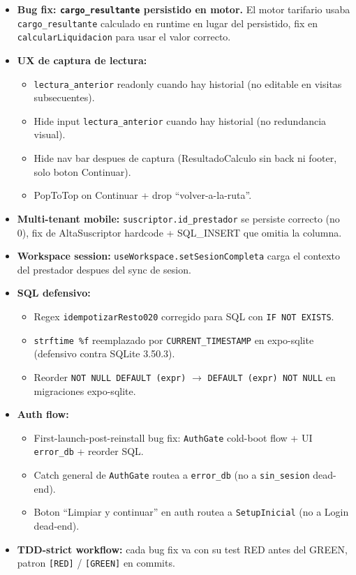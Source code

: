 \documentclass[11pt,a4paper,oneside]{report}
\begin{document}
\begin{itemize}[leftmargin=*]
    \item \textbf{Bug fix: \texttt{cargo\_resultante} persistido en motor.} El motor tarifario usaba \texttt{cargo\_resultante} calculado en runtime en lugar del persistido, fix en \texttt{calcularLiquidacion} para usar el valor correcto.
    \item \textbf{UX de captura de lectura:}
    \begin{itemize}
        \item \texttt{lectura\_anterior} readonly cuando hay historial (no editable en visitas subsecuentes).
        \item Hide input \texttt{lectura\_anterior} cuando hay historial (no redundancia visual).
        \item Hide nav bar despues de captura (ResultadoCalculo sin back ni footer, solo boton Continuar).
        \item PopToTop on Continuar + drop ``volver-a-la-ruta''.
    \end{itemize}
    \item \textbf{Multi-tenant mobile:} \texttt{suscriptor.id\_prestador} se persiste correcto (no 0), fix de AltaSuscriptor hardcode + SQL\_INSERT que omitia la columna.
    \item \textbf{Workspace session:} \texttt{useWorkspace.setSesionCompleta} carga el contexto del prestador despues del sync de sesion.
    \item \textbf{SQL defensivo:}
    \begin{itemize}
        \item Regex \texttt{idempotizarResto020} corregido para SQL con \texttt{IF NOT EXISTS}.
        \item \texttt{strftime \%f} reemplazado por \texttt{CURRENT\_TIMESTAMP} en expo-sqlite (defensivo contra SQLite 3.50.3).
        \item Reorder \texttt{NOT NULL DEFAULT (expr)} $\to$ \texttt{DEFAULT (expr) NOT NULL} en migraciones expo-sqlite.
    \end{itemize}
    \item \textbf{Auth flow:}
    \begin{itemize}
        \item First-launch-post-reinstall bug fix: \texttt{AuthGate} cold-boot flow + UI \texttt{error\_db} + reorder SQL.
        \item Catch general de \texttt{AuthGate} routea a \texttt{error\_db} (no a \texttt{sin\_sesion} dead-end).
        \item Boton ``Limpiar y continuar'' en auth routea a \texttt{SetupInicial} (no a Login dead-end).
    \end{itemize}
    \item \textbf{TDD-strict workflow:} cada bug fix va con su test RED antes del GREEN, patron \texttt{[RED]} / \texttt{[GREEN]} en commits.
\end{itemize}
\end{document}
